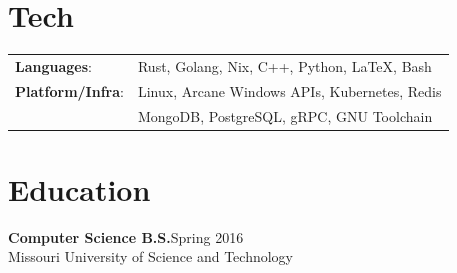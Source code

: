 \documentclass[margin]{res}
\begin{document}
\begin{resume}
    \section{Tech}
      \begin{tabular}{l p{3.6in}}
        \textbf{Languages}:                   & Rust, Golang, Nix, C++, Python, \LaTeX, Bash \\ [1pt]
        \textbf{Platform/Infra}:              & Linux, Arcane Windows APIs, Kubernetes, Redis \\ [1pt]
                                              & MongoDB, PostgreSQL, gRPC, GNU Toolchain \\ [1pt]
      \end{tabular}
    \section{Education}
    \textbf{Computer Science B.S.}\hfill Spring 2016 \\ [1pt]
    Missouri University of Science and Technology

  \end{resume}
\end{document}

